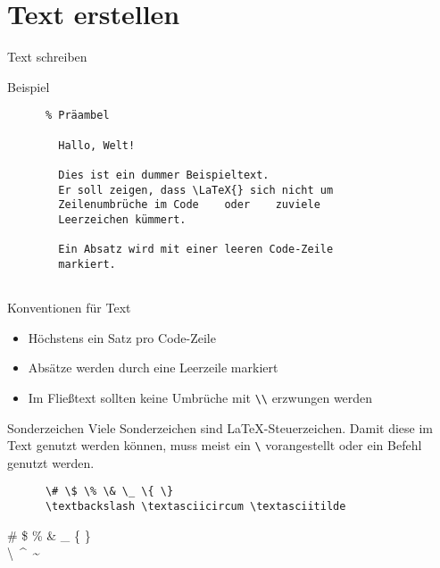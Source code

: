 \section{Text erstellen}

\begin{frame}[fragile]{Text schreiben}
  \begin{block}{Beispiel}
    \begin{lstlisting}
      % Präambel
      
        Hallo, Welt!

        Dies ist ein dummer Beispieltext.
        Er soll zeigen, dass \LaTeX{} sich nicht um
        Zeilenumbrüche im Code    oder    zuviele
        Leerzeichen kümmert.

        Ein Absatz wird mit einer leeren Code-Zeile
        markiert.
      
    \end{lstlisting}
  \end{block}
\end{frame}

\begin{frame}[fragile]{Konventionen für Text}
  \begin{itemize}
    \item Höchstens ein Satz pro Code-Zeile
    \item Absätze werden durch eine Leerzeile markiert
    \item Im Fließtext sollten keine Umbrüche mit \lstinline+\\+ erzwungen werden
  \end{itemize}
  \begin{alertblock}{Sonderzeichen}
    Viele Sonderzeichen sind \LaTeX-Steuerzeichen.
    Damit diese im Text genutzt werden können, muss meist ein \verb+\+ vorangestellt oder ein Befehl genutzt werden.
  \end{alertblock}
  \begin{CodeExample}{0.7}
    \begin{lstlisting}
      \# \$ \% \& \_ \{ \}
      \textbackslash \textasciicircum \textasciitilde
    \end{lstlisting}
  \CodeResult
    \strut
    \# \$ \% \& \_ \{ \} \\
    \textbackslash\ \textasciicircum\ \textasciitilde
  \end{CodeExample}
\end{frame}

